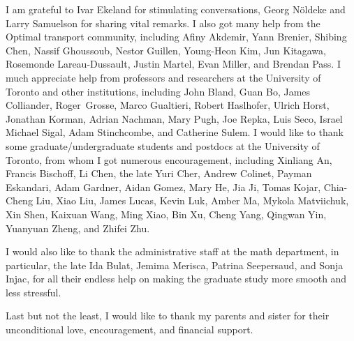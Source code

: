\documentclass{ut-thesis}[10pt]
\theoremstyle{plain}
\theoremstyle{definition}
\theoremstyle{remark}
\numberwithin{equation}{section}
\begin{document}
\begin{preliminary}
\begin{acknowledgements}
I am grateful to Ivar Ekeland for stimulating conversations, Georg N\" oldeke and Larry Samuelson for sharing vital remarks.
I also got many help from the Optimal transport community, including  Afiny Akdemir, Yann Brenier, Shibing Chen, Nassif Ghoussoub,  Nestor Guillen, Young-Heon Kim, Jun Kitagawa, Rosemonde Lareau-Dussault, Justin Martel, Evan Miller, and Brendan Pass. I much appreciate help from professors and researchers at the University of Toronto and other institutions, including John Bland, Guan Bo, James Colliander, Roger~Grosse, Marco Gualtieri, Robert Haslhofer, Ulrich Horst, Jonathan Korman, Adrian Nachman, Mary Pugh, Joe Repka, Luis Seco,  Israel Michael Sigal, Adam Stinchcombe, and Catherine Sulem.
I would like to thank some graduate/undergraduate students and postdocs at the University of Toronto, from whom I got numerous encouragement, including Xinliang An,  Francis Bischoff, Li Chen, the late Yuri Cher,  Andrew Colinet, Payman Eskandari, Adam Gardner, Aidan Gomez, Mary He,  Jia Ji, Tomas Kojar, Chia-Cheng Liu, Xiao Liu,  James Lucas, Kevin Luk,  Amber Ma,  Mykola Matviichuk,  Xin Shen,  Kaixuan Wang,  Ming Xiao, Bin Xu,   Cheng Yang,  Qingwan Yin, Yuanyuan Zheng, and Zhifei Zhu.\medskip
 


I would also like to thank the administrative staff at the math department, in particular, the late Ida Bulat, Jemima Merisca, Patrina Seepersaud, and Sonja Injac, for all their endless help on making the graduate study more smooth and less stressful.  \medskip

Last but not the least, I would like to thank my parents and sister for their unconditional love, encouragement, and financial support.\medskip


\end{acknowledgements}

\tableofcontents




\end{preliminary}
\end{document}
